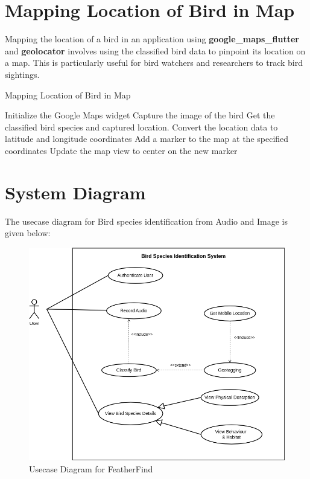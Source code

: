 \newpage


\section{Mapping Location of Bird in Map}

Mapping the location of a bird in an application using
\textbf{google\_maps\_flutter} and \textbf{geolocator} involves using the
classified bird data to
pinpoint its location on a map. This is particularly useful for bird watchers
and researchers to track bird sightings.

\begin{algorithm}
    \caption{Mapping Location of Bird in Map}
    \begin{algorithmic}[1]
        \STATE Initialize the Google Maps widget
        \STATE Capture the image of the bird
        \STATE Get the classified bird species and captured location.
        \STATE Convert the location data to latitude and longitude coordinates
        \STATE Add a marker to the map at the specified coordinates
        \STATE Update the map view to center on the new marker
    \end{algorithmic}
\end{algorithm}
\newpage
\section{System Diagram}
The usecase diagram for Bird species identification from Audio and Image is
given
below:
\begin{figure}[h!]
    \centering
    \includegraphics[scale=0.5]{images/usecase.png}
    \caption{Usecase Diagram for
        FeatherFind}%
\end{figure}

